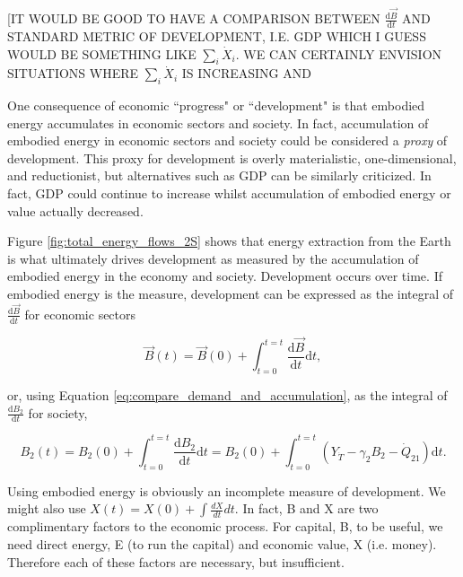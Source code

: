 [IT WOULD BE GOOD TO HAVE A COMPARISON BETWEEN $\frac{\mathrm{d}\vec{B}}{\mathrm{d}t}$ AND STANDARD METRIC OF DEVELOPMENT, I.E. GDP WHICH I GUESS WOULD BE SOMETHING LIKE $\sum_{i}\dot{X}_{i}$. WE CAN CERTAINLY ENVISION SITUATIONS WHERE $\sum_{i}\dot{X}_{i}$ IS INCREASING AND 

One consequence of economic ``progress" or ``development" is that embodied energy accumulates in economic sectors and society. In fact, accumulation of embodied energy in economic sectors and society could be considered a \emph{proxy} of development. This proxy for development is overly materialistic, one-dimensional, and reductionist, but alternatives such as GDP can be similarly criticized. In fact, GDP could continue to increase whilst accumulation of embodied energy or value actually decreased.

Figure \ref{fig:total_energy_flows_2S} shows that energy extraction from the Earth is what ultimately drives development as measured by the accumulation of embodied energy in the economy and society. Development occurs over time. If embodied energy is the measure, development can be expressed as the integral of $\frac{\mathrm{d}\vec{B}}{\mathrm{d}t}$ for economic sectors

\begin{equation} \label{eq:Dev_Integral_Economy}
	\vec{B}(t) = \vec{B}(0) + \int_{t=0}^{t=t} \frac{\mathrm{d}\vec{B}}{\mathrm{d}t}\mathrm{d}t,
\end{equation}

\noindent or, using Equation \ref{eq:compare_demand_and_accumulation}, as the integral of $\frac{\mathrm{d}B_{2}}{\mathrm{d}t}$ for society,

\begin{equation} \label{eq:Dev_Integral_Society}
	B_{2}(t) = B_{2}(0) + \int_{t=0}^{t=t} \frac{\mathrm{d}B_{2}}{\mathrm{d}t}\mathrm{d}t = B_{2}(0) + \int_{t=0}^{t=t} (Y_{\dot{T}} - \gamma_{2}B_{2} - \dot{Q}_{21})\mathrm{d}t.
\end{equation}


Using embodied energy is obviously an incomplete measure of development. We might also use $X(t) = X(0) + \int\frac{dX}{dt}dt$. In fact, B and X are two complimentary factors to the economic process. For capital, B, to be useful, we need direct energy, E (to run the capital) and economic value, X (i.e. money). Therefore each of these factors are necessary, but insufficient.


